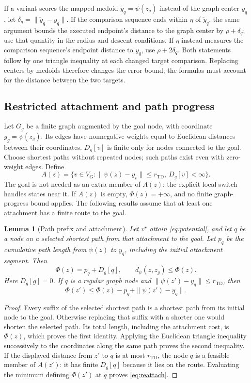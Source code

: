 \documentclass{article}
\newcommand{\Htd}{r_{\mathrm{TD}}}
\newcommand{\dd}{d_{\psi}}
\newtheorem{lemma}[theorem]{Lemma}
\theoremstyle{definition}
\theoremstyle{remark}
\begin{document}
If a variant scores the mapped medoid $\tilde y_q=\psi(z_q)$ instead of the graph
center $y_q$, let $\delta_q=\|\tilde y_q-y_q\|$.
If the comparison sequence ends within $\eta$ of $\tilde y_q$, the same argument bounds
the executed endpoint's distance to the graph center by $\rho+\delta_q$; use that
quantity in the radius and descent conditions. If $\eta$ instead measures the
comparison sequence's endpoint distance to $y_q$, use $\rho+2\delta_q$.
Both statements follow by one triangle inequality at each changed target comparison.
Replacing centers by medoids therefore changes the error bound; the formulas must
account for the distance between the two targets.

\subsection{Restricted attachment and path progress}
\label{app:graph-proof}
Let $G_g$ be a finite graph augmented by the goal node, with coordinate $y_g=\psi(z_g)$.
Its edges have nonnegative weights equal to Euclidean distances between their coordinates.
$D_g[v]$ is finite only for nodes connected to the goal. Choose shortest paths without
repeated nodes; such paths exist even with zero-weight edges. Define
\[
 A(z)=\{v\in V_G:\|\psi(z)-y_v\|\le\Htd,\ D_g[v]<\infty\}.
\]
The goal is not needed as an extra member of $A(z)$: the explicit local switch handles
states near it. If $A(z)$ is empty, $\Phi(z)=+\infty$, and no finite graph-progress bound
applies. The following results assume that at least one attachment has a finite route to the goal.

\begin{lemma}[Path prefix and attachment]
\label{lem:path-prefix}
Let $v^\star$ attain \cref{eq:potential}, and let $q$ be a node on a selected shortest
path from that attachment to the goal. Let $p_q$ be the cumulative path length from
$\psi(z)$ to $y_q$, including the initial attachment segment. Then
\begin{equation}
 \Phi(z)=p_q+D_g[q],\qquad
 \dd(z,z_g)\le\Phi(z).
 \label{eq:prefix-identity}
\end{equation}
Here $D_g[g]=0$. If $q$ is a regular graph node and
$\|\psi(z')-y_q\|\le\Htd$, then
\begin{equation}
 \Phi(z')\le\Phi(z)-p_q+\|\psi(z')-y_q\|.
 \label{eq:reattach}
\end{equation}
\end{lemma}
\begin{proof}
Every suffix of the selected shortest path is a shortest path from its initial node
to the goal. Otherwise replacing that suffix with a shorter one would shorten the
selected path. Its total length, including the attachment cost, is $\Phi(z)$, which
proves the first identity. Applying the Euclidean triangle inequality successively to
the coordinates along the same path proves the second inequality. If the displayed
distance from $z'$ to $q$ is at most $\Htd$, the node $q$ is a feasible member of $A(z')$:
it has finite $D_g[q]$ because it lies on the route. Evaluating the minimum defining
$\Phi(z')$ at $q$ proves \cref{eq:reattach}.
\end{proof}
\end{document}
